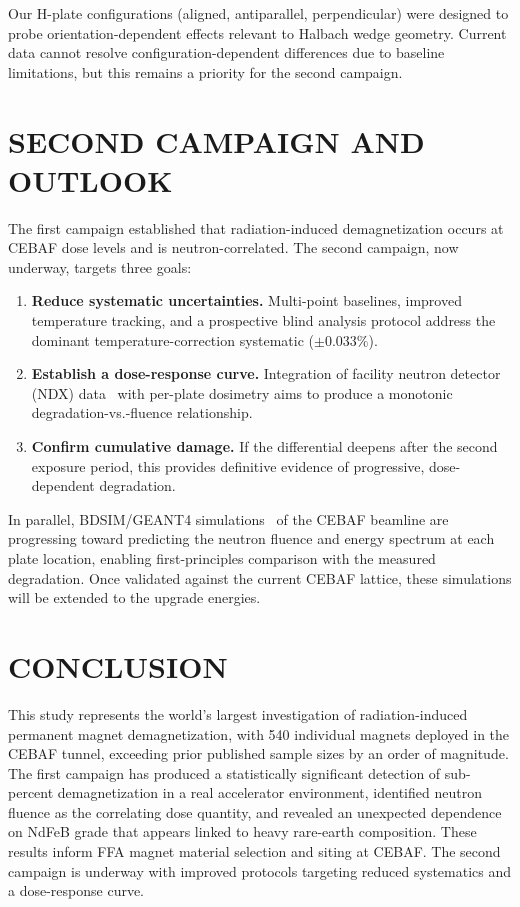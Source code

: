 \documentclass[a4paper,
               ]{jacow}
\begin{document}
Our H-plate configurations (aligned, antiparallel, perpendicular) were designed to probe orientation-dependent effects relevant to Halbach wedge geometry. Current data cannot resolve configuration-dependent differences due to baseline limitations, but this remains a priority for the second campaign.

\section{SECOND CAMPAIGN AND OUTLOOK}

The first campaign established that radiation-induced demagnetization occurs at CEBAF dose levels and is neutron-correlated. The second campaign, now underway, targets three goals:

\begin{enumerate}
\item \textbf{Reduce systematic uncertainties.} Multi-point baselines, improved temperature tracking, and a prospective blind analysis protocol address the dominant temperature-correction systematic (${\pm}0.033\%$).
\item \textbf{Establish a dose-response curve.} Integration of facility neutron detector (NDX) data~\cite{NDX} with per-plate dosimetry aims to produce a monotonic degradation-vs.-fluence relationship.
\item \textbf{Confirm cumulative damage.} If the differential deepens after the second exposure period, this provides definitive evidence of progressive, dose-dependent degradation.
\end{enumerate}

In parallel, BDSIM/GEANT4 simulations~\cite{NEVAY:BDSIM, GEANT4, Gamage:IPAC24-THPS57, Gamage:NAPAC25-WEP074} of the CEBAF beamline are progressing toward predicting the neutron fluence and energy spectrum at each plate location, enabling first-principles comparison with the measured degradation. Once validated against the current CEBAF lattice, these simulations will be extended to the upgrade energies.

\section{CONCLUSION}

This study represents the world's largest investigation of radiation-induced permanent magnet demagnetization, with 540 individual magnets deployed in the CEBAF tunnel, exceeding prior published sample sizes by an order of magnitude. The first campaign has produced a statistically significant detection of sub-percent demagnetization in a real accelerator environment, identified neutron fluence as the correlating dose quantity, and revealed an unexpected dependence on NdFeB grade that appears linked to heavy rare-earth composition. These results inform FFA magnet material selection and siting at CEBAF. The second campaign is underway with improved protocols targeting reduced systematics and a dose-response curve.
\end{document}

